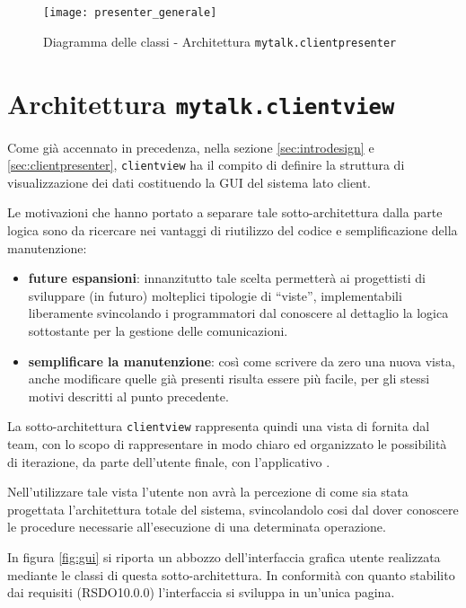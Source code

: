 \begin{figure}[H]
  \centering
  \texttt{[image: presenter\_generale]}
  \caption{Diagramma delle classi - Architettura \texttt{mytalk.clientpresenter}}\label{fig:sottoarchpresenter}
  \end{figure}
\clearpage

\section{Architettura \texttt{mytalk.clientview}}\label{sec:clientview}
Come già accennato in precedenza, nella sezione \ref{sec:introdesign} e \ref{sec:clientpresenter}, \texttt{clientview} ha il compito di definire la struttura di visualizzazione dei dati costituendo la GUI del sistema lato client.

Le motivazioni che hanno portato a separare tale sotto-architettura dalla parte logica sono da ricercare nei vantaggi di riutilizzo del codice e semplificazione della manutenzione:
\begin{itemize}
 	\item \textbf{future espansioni}: innanzitutto tale scelta permetterà ai progettisti di sviluppare (in futuro) molteplici tipologie di ``viste'', implementabili liberamente svincolando i programmatori dal conoscere al dettaglio la logica sottostante per la gestione delle comunicazioni.
 	\item \textbf{semplificare la manutenzione}: così come scrivere da zero una nuova vista, anche modificare quelle già presenti risulta essere più facile, per gli stessi motivi descritti al punto precedente.
\end{itemize}

La sotto-architettura \texttt{clientview} rappresenta quindi una vista di  fornita dal team, con lo scopo di rappresentare in modo chiaro ed organizzato le possibilità di iterazione, da parte dell'utente finale, con l'applicativo \caName.

Nell'utilizzare tale vista l'utente non avrà la percezione di come sia stata progettata l'architettura totale del sistema, svincolandolo cosi dal dover conoscere le procedure necessarie all'esecuzione di una determinata operazione.

In figura \ref{fig:gui} si riporta un abbozzo dell'interfaccia grafica utente realizzata mediante le classi di questa sotto-architettura. In conformità con quanto stabilito dai requisiti (RSDO10.0.0) l'interfaccia si sviluppa in un'unica pagina.

